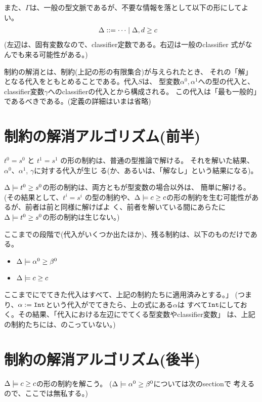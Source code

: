 また、$\Gamma$は、一般の型文脈であるが、不要な情報を落として以下の形にしてよい。
\begin{align*}
  \Delta & ::= \cdots \mid \Delta,{d} \ge {c}
\end{align*}
(左辺は、固有変数なので、classifier定数である。右辺は一般のclassifier
式がなんでも来る可能性がある。)

制約の解消とは、制約(上記の形の有限集合)が与えられたとき、
それの「解」となる代入をともとめることである。代入$S$は、
型変数$\alpha^0, \alpha^1$への型の代入と、
classifier変数$\gamma$へのclassifierの代入とから構成される。
この代入は「最も一般的」であるべきである。(定義の詳細はいまは省略)

\section{制約の解消アルゴリズム(前半)}

$t^0=s^0$ と $t^1=s^1$ の形の制約は、普通の型推論で解ける。
それを解いた結果、$\alpha^0$、$\alpha^1$, $\gamma$に対する代入が生じ
る(か、あるいは、「解なし」という結果になる)。

$\Delta \models {t^0} \ge {s^0}$の形の制約は、両方ともが型変数の場合以外は、
簡単に解ける。(その結果として、$t^i=s^i$ の型の制約や、$\Delta \models
{c} \ge {c}$の形の制約を生む可能性があるが、前者は前と同様に解けばよ
く、前者を解いている間にあらたに$\Delta \models {t^0} \ge {s^0}$の形の制約は生じない。)

ここまでの段階で(代入がいくつか出たほか)、残る制約は、以下のものだけである。

\begin{itemize}
\item $\Delta \models {\alpha^0} \ge {\beta^0}$
\item $\Delta \models {c} \ge {c}$
\end{itemize}

ここまでにでてきた代入はすべて、上記の制約たちに適用済みとする。」
(つまり、$\alpha:=\mbox{\texttt{Int}}$という代入がでてきたら、上の式にある$\alpha$は
すべて$\mbox{\texttt{Int}}$にしておく。その結果、「代入における左辺にでてくる型変数やclassifier変数」
は、上記の制約たちには、のこっていない。)


\section{制約の解消アルゴリズム(後半)}

$\Delta \models {c} \ge {c}$の形の制約を解こう。
($\Delta \models {\alpha^0} \ge {\beta^0}$については次のsectionで
考えるので、ここでは無私する。)

